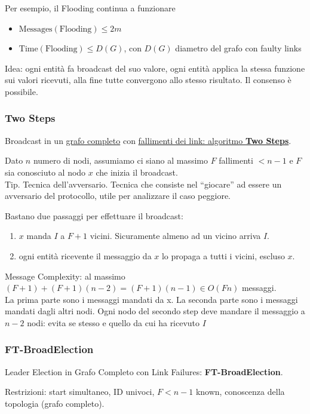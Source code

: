 Per esempio, il Flooding continua a funzionare
\begin{itemize}
  \item $\text{Messages}(\text{Flooding}) \leq 2m$
  \item $\text{Time}(\text{Flooding}) \leq D(G)$, con $D(G)$ diametro del grafo con faulty links
\end{itemize}

Idea: ogni entità fa broadcast del suo valore, ogni entità applica la stessa funzione sui valori ricevuti, alla fine tutte convergono allo
stesso risultato. Il consenso è possibile.

\subsubsection{Two Steps}
Broadcast in un \underline{grafo completo} con \underline{fallimenti dei link: algoritmo \textbf{Two Steps}}.

Dato $n$ numero di nodi, assumiamo ci siano al massimo $F$ fallimenti $< n-1$ e $F$ sia conosciuto al nodo $x$ che inizia il broadcast.\\
Tip. Tecnica dell'avversario. Tecnica che consiste nel ``giocare'' ad essere un avversario del protocollo, utile per analizzare il caso peggiore.

Bastano due passaggi per effettuare il broadcast:
\begin{enumerate}
  \item $x$ manda $I$ a $F+1$ vicini. Sicuramente almeno ad un vicino arriva $I$.
  \item ogni entità ricevente il messaggio da $x$ lo propaga a tutti i vicini, escluso $x$.
\end{enumerate}

Message Complexity: al massimo $(F+1) + (F+1) (n-2) = (F+1) (n-1) \in O(Fn)$ messaggi.\\
La prima parte sono i messaggi mandati da x. La seconda parte sono i messaggi mandati dagli altri nodi. Ogni nodo
del secondo step deve mandare il messaggio a $n-2$ nodi: evita se stesso e quello da cui ha ricevuto $I$

\subsubsection{FT-BroadElection}
Leader Election in Grafo Completo con Link Failures: \textbf{FT-BroadElection}.

Restrizioni: start simultaneo, ID univoci, $F < n-1$ known, conoscenza della topologia (grafo completo).

